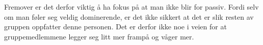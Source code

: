 Fremover er det derfor viktig å ha fokus på at man ikke blir for passiv. Fordi selv om man føler seg veldig dominerende, er det ikke sikkert at det er slik resten av gruppen oppfatter denne personen. Det er derfor ikke noe i veien for at gruppemedlemmene legger seg litt mer frampå og våger mer.



